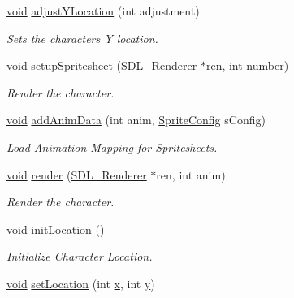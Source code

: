 \begin{DoxyCompactItemize}
\mbox{\hyperlink{_s_d_l__opengles2__gl2ext_8h_ae5d8fa23ad07c48bb609509eae494c95}{void}} \mbox{\hyperlink{class_main_character_abd249b341c749175c078aebef0351a0e}{adjust\+Y\+Location}} (int adjustment)
\begin{DoxyCompactList}\small\item\em Sets the character\textquotesingle{}s Y location. \end{DoxyCompactList}\item 
\mbox{\hyperlink{_s_d_l__opengles2__gl2ext_8h_ae5d8fa23ad07c48bb609509eae494c95}{void}} \mbox{\hyperlink{class_main_character_a8af26b46fe4d77720ee4af55c1a7e48b}{setup\+Spritesheet}} (\mbox{\hyperlink{_s_d_l__render_8h_aaf0bf7d020754fc614fe06552ea4d5d4}{S\+D\+L\+\_\+\+Renderer}} $\ast$ren, int number)
\begin{DoxyCompactList}\small\item\em Render the character. \end{DoxyCompactList}\item 
\mbox{\hyperlink{_s_d_l__opengles2__gl2ext_8h_ae5d8fa23ad07c48bb609509eae494c95}{void}} \mbox{\hyperlink{class_main_character_a8695871c895e5c13d814d397cc61dfa3}{add\+Anim\+Data}} (int anim, \mbox{\hyperlink{struct_sprite_config}{Sprite\+Config}} s\+Config)
\begin{DoxyCompactList}\small\item\em Load Animation Mapping for Spritesheets. \end{DoxyCompactList}\item 
\mbox{\hyperlink{_s_d_l__opengles2__gl2ext_8h_ae5d8fa23ad07c48bb609509eae494c95}{void}} \mbox{\hyperlink{class_main_character_adc42e8f1488d22c15eea5e814913e255}{render}} (\mbox{\hyperlink{_s_d_l__render_8h_aaf0bf7d020754fc614fe06552ea4d5d4}{S\+D\+L\+\_\+\+Renderer}} $\ast$ren, int anim)
\begin{DoxyCompactList}\small\item\em Render the character. \end{DoxyCompactList}\item 
\mbox{\hyperlink{_s_d_l__opengles2__gl2ext_8h_ae5d8fa23ad07c48bb609509eae494c95}{void}} \mbox{\hyperlink{class_main_character_a245e5d6922a50bf19f89eaf93d4c3dbf}{init\+Location}} ()
\begin{DoxyCompactList}\small\item\em Initialize Character Location. \end{DoxyCompactList}\item 
\mbox{\hyperlink{_s_d_l__opengles2__gl2ext_8h_ae5d8fa23ad07c48bb609509eae494c95}{void}} \mbox{\hyperlink{class_main_character_a19cd3b43e2e67f317c873aedd8a01906}{set\+Location}} (int \mbox{\hyperlink{_s_d_l__opengl_8h_ad0e63d0edcdbd3d79554076bf309fd47}{x}}, int \mbox{\hyperlink{_s_d_l__opengl_8h_a1675d9d7bb68e1657ff028643b4037e3}{y}})

\end{DoxyCompactItemize}
